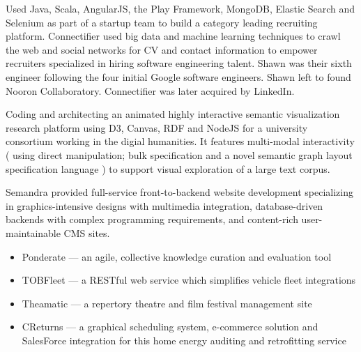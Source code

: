 \documentclass[line,margin,hidelinks]{res}
\begin{document}
\begin{resume}

\begin{position}
Used Java, Scala, AngularJS, the Play Framework, MongoDB, Elastic
Search and Selenium as part of a startup team to build a category
leading recruiting platform.  Connectifier used big data and machine
learning techniques to crawl the web and social networks for CV and
contact information to empower recruiters specialized in hiring
software engineering talent.  Shawn was their sixth engineer following
the four initial Google software engineers.  Shawn left to found Nooron
Collaboratory.  Connectifier was later acquired by LinkedIn.
\end{position}


\begin{position}
Coding and architecting an animated highly interactive semantic
visualization research platform using D3, Canvas, RDF and NodeJS for a
university consortium working in the digial humanities.  It features
multi-modal interactivity ( using direct manipulation; bulk
specification and a novel semantic graph layout specification language
) to support visual exploration of a large text corpus.
\end{position}


\begin{position}
Semandra provided full-service front-to-backend
website development specializing in graphics-intensive designs with
multimedia integration, database-driven backends with complex
programming requirements, and content-rich user-maintainable CMS
sites.

\begin{itemize}
  \item Ponderate --- an agile, collective knowledge curation and evaluation tool
  \item TOBFleet --- a RESTful web service which simplifies vehicle fleet integrations
  \item Theamatic --- a repertory theatre and film festival management site
  \item CReturns --- a graphical scheduling system, e-commerce
    solution and SalesForce integration for this home energy auditing and
    retrofitting service
\end{itemize}
\end{position}


\end{resume}
\end{document}
